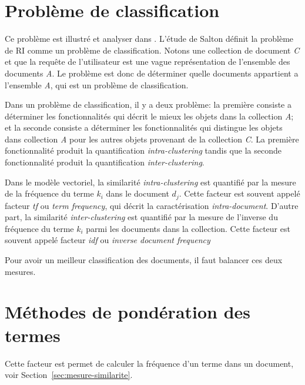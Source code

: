 \section{Problème de classification}
Ce problème est illustré et analyser dans \citep{modern-ir}. L'étude de Salton définit la problème de RI comme un problème de classification. Notons une collection de document \emph{C} et que la requête de l'utilisateur est une vague représentation de l'ensemble des documents \emph{A}. Le problème est donc de déterminer quelle documents appartient a l'ensemble \emph{A}, qui est un problème de classification.

Dans un problème de classification, il y a deux problème: la première consiste a déterminer les fonctionnalités qui décrit le mieux les objets dans la collection \emph{A}; et la seconde consiste a déterminer les fonctionnalités qui distingue les objets dans collection \emph{A} pour les autres objets provenant de la collection \emph{C}. La première fonctionnalité produit la quantification \emph{intra-clustering} tandis que la seconde fonctionnalité produit la quantification \emph{inter-clustering}.

Dans le modèle vectoriel, la similarité \emph{intra-clustering} est quantifié par la mesure de la fréquence du terme $k_{i}$ dans le document $d_{j}$. Cette facteur est souvent appelé facteur \emph{tf} ou \emph{term frequency}, qui décrit la caractérisation \emph{intra-document}. D'autre part, la similarité \emph{inter-clustering} est quantifié par la mesure de l'inverse du fréquence du terme $k_{i}$ parmi les documents dans la collection. Cette facteur est souvent appelé facteur \emph{idf} ou \emph{inverse document frequency}

Pour avoir un meilleur classification des documents, il faut balancer ces deux mesures.

\section{Méthodes de pondération des termes}
Cette facteur est permet de calculer la fréquence d'un terme dans un document, voir Section~\ref{sec:mesure-similarite}.

